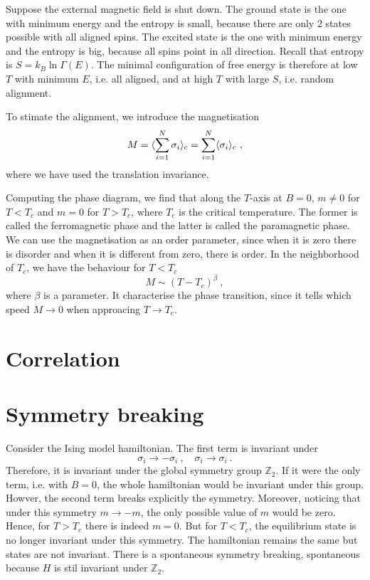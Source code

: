     Suppose the external magnetic field is shut down. The ground state is the one with minimum energy and the entropy is small, because there are only $2$ states possible with all aligned spins. The excited state is the one with minimum energy and the entropy is big, because all spins point in all direction. Recall that entropy is $S = k_B \ln \Gamma(E)$. The minimal configuration of free energy is therefore at low $T$ with minimum $E$, i.e. all aligned, and at high $T$ with large $S$, i.e. random alignment.

    To stimate the alignment, we introduce the magnetisation 
    \begin{equation*}
        M = \langle\sum_{i=1}^N \sigma_i\rangle_c = \sum_{i=1}^N \langle\sigma_i\rangle_c ~,
    \end{equation*}
    where we have used the translation invariance. 

    Computing the phase diagram, we find that along the $T$-axis at $B=0$, $m \neq 0$ for $T < T_c$ and $m = 0$ for $T > T_c$, where $T_c$ is the critical temperature. The former is called the ferromagnetic phase and the latter is called the paramagnetic phase. We can use the magnetisation as an order parameter, since when it is zero there is disorder and when it is different from zero, there is order. In the neighborhood of $T_c$, we have the behaviour for $T < T_c$
    \begin{equation*}
        M \sim (T - T_c)^\beta ~,
    \end{equation*}
    where $\beta$ is a parameter. It characterise the phase transition, since it tells which speed $M \rightarrow 0$ when approacing $T \rightarrow T_c$.

\section{Correlation}

\section{Symmetry breaking}

    Consider the Ising model hamiltonian. The first term is invariant under 
    \begin{equation*}
        \sigma_i \rightarrow - \sigma_i ~, \quad \sigma_i \rightarrow \sigma_i ~.
    \end{equation*}
    Therefore, it is invariant under the global symmetry group $\mathbb Z_2$. If it were the only term, i.e. with $B=0$, the whole hamiltonian would be invariant under this group. Howver, the second term breaks explicitly the symmetry. Moreover, noticing that under this symmetry $m \rightarrow - m$, the only possible value of $m$ would be zero. Hence, for $T > T_c$ there is indeed $m=0$. But for $T < T_c$, the equilibrium state is no longer invariant under this symmetry. The hamiltonian remains the same but states are not invariant. There is a spontaneous symmetry breaking, spontaneous because $H$ is stil invariant under $\mathbb Z_2$.

